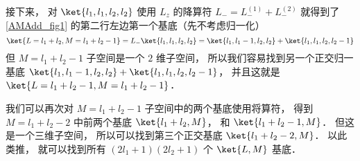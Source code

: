 接下来， 对 $\ket{l_1, l_1, l_2, l_2}$ 使用 $L_z$ 的降算符 $L_- = L_-^{(1)} + L_-^{(2)}$ 就得到了\autoref{AMAdd_fig1} 的第二行左边第一个基底（先不考虑归一化）
\begin{equation}
\ket{L = l_1 + l_2, M = l_1 + l_2 - 1} = L_- \ket{l_1, l_1, l_2, l_2} = \ket{l_1, l_1 - 1, l_2, l_2} + \ket{l_1, l_1, l_2, l_2 - 1}
\end{equation}
但 $M = l_1 + l_2 - 1$ 子空间是一个 $2$ 维子空间， 所以我们容易找到另一个正交归一基底 $\ket{l_1, l_1 - 1, l_2, l_2} + \ket{l_1, l_1, l_2, l_2 - 1}$， 并且这就是 $\ket{L = l_1 + l_2 - 1, M = l_1 + l_2 - 1}$．

我们可以再次对 $M = l_1 + l_2 - 1$ 子空间中的两个基底使用将算符， 得到 $M = l_1 + l_2 - 2$ 中前两个基底 $\ket{l_1 + l_2, M}$， 和 $\ket{l_1 + l_2 - 1, M}$． 但这是一个三维子空间， 所以可以找到第三个正交基底 $\ket{l_1 + l_2 - 2, M}$． 以此类推， 就可以找到所有 $(2l_1+1)(2l_2+1)$ 个 $\ket{L,M}$ 基底．
